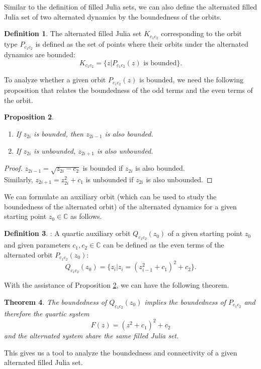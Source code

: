 \documentclass{amsart}
\theoremstyle{plain}
\newtheorem{theorem}{Theorem}[section]
\newtheorem{proposition}[theorem]{Proposition}
\theoremstyle{definition}
\newtheorem{definition}[theorem]{Definition}
\theoremstyle{remark}
\numberwithin{equation}{section}
\newcommand{\C}{\mathbb{C}}
\begin{document}
  Similar to the definition of filled Julia sets, we can also define the alternated filled Julia set of two alternated dynamics by the boundedness of the orbits.
  \begin{definition}
      The alternated filled Julia set $K_{c_1c_2}$ corresponding to the orbit type $P_{c_1c_2}$ is defined as the set of points where their orbits under the alternated dynamics are bounded:
        \[
        K_{c_1c_2} = \{z|P_{c_1c_2}(z)\text{ is bounded}\}.
        \] 
  \end{definition}
  To analyze whether a given orbit $P_{c_1c_2}(z)$ is bounded, we need the following proposition that relates the boundedness of the odd terms and the even terms of the orbit.
  \begin{proposition}\cite[Proposition 2.1]{MR2567586}
    \label{prop:boundedness}
    \begin{enumerate}
        \item If $z_{2i}$ is bounded, then $z_{2i-1}$ is also bounded.
        \item If $z_{2i}$ is unbounded, $z_{2i+1}$ is also unbounded.
    \end{enumerate}
  \end{proposition}
  \begin{proof}
      $z_{2i-1} = \sqrt{z_{2i}-c_2}$ is bounded if $z_{2i}$ is also bounded. \\Similarly, $z_{2i+1} = z_{2i}^2 + c_1$ is unbounded if $z_{2i}$ is also unbounded.
  \end{proof}
  We can formulate an auxiliary orbit (which can be used to study the boundedness of the alternated orbit) of the alternated dynamics for a given starting point $z_0\in\C$ as follows. 
  \begin{definition}\cite[Equation 5]{MR2567586}:
      A quartic auxiliary orbit $Q_{c_1c_2}(z_0)$ of a given starting point $z_0$ and given parameters $c_1, c_2\in\C$ can be defined as the even terms of the alternated orbit $P_{c_1c_2}(z_0)$:
        \[
      Q_{c_1c_2}(z_0) = \{z_i|z_i=(z_{i-1}^2+c_1)^2+c_2\}. 
      \]
  \end{definition}
  With the assistance of Proposition \ref{prop:boundedness}, we can have the following theorem.
  \begin{theorem} \cite[Theorem 2.2 and 2.3]{MR2567586}
        \label{thm:qua}
      The boundedness of $Q_{c_1c_2}(z_0)$ implies the boundedness of $P_{c_1c_2}$ and therefore the quartic system \[F(z) = (z^2+c_1)^2 + c_2\] and the alternated system share the same filled Julia set.
  \end{theorem}
  This gives us a tool to analyze the boundedness and connectivity of a given alternated filled Julia set. \\
\end{document}
